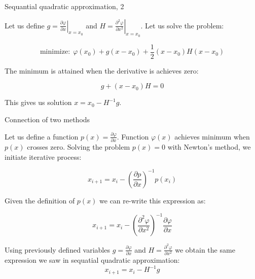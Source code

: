 \documentclass{beamer}
\begin{document}
\begin{frame}{Sequantial quadratic approximation, 2}
	\begin{flushleft}
		
		Let us define $g =\left. \frac{\partial \varphi}{\partial x} \right \vert_{x = x_0}$ and $H = \left. \frac{\partial^2 \varphi}{\partial x^2}\right \vert_{x = x_0}$. Let us solve the problem:
		
		\begin{equation}
			\text{minimize:} \ \ \varphi(x_0) + g (x - x_0)
			+  \frac{1}{2}  (x - x_0) H (x - x_0)
		\end{equation}
		
		The minimum is attained when the derivative is achieves zero:
		
		\begin{equation}
			g + (x - x_0) H = 0
		\end{equation}
		
		This gives us solution $x = x_0 - H^{-1} g$.
		
	\end{flushleft}
\end{frame}





\begin{frame}{Connection of two methods}
	\begin{flushleft}
		
		Let us define a function $p(x) = \frac{\partial \varphi}{\partial x}$. Function $\varphi (x)$ achieves minimum when $p(x)$ crosses zero. Solving the problem $p(x) = 0$ with Newton's method, we initiate iterative process:
		
		\begin{equation}
			x_{i+1} = x_i  - \left ( \frac{\partial p}{\partial x} \right )^{-1} p(x_i)
		\end{equation}
		
		Given the definition of $p(x)$ we can re-write this expression as:
		
		\begin{equation}
			x_{i+1} = x_i  - \left ( \frac{\partial^2 \varphi}{\partial x^2} \right )^{-1} \frac{\partial \varphi}{\partial x}
		\end{equation}
		
		Using previously defined variables $g =\frac{\partial \varphi}{\partial x}$ and $H = \frac{\partial^2 \varphi}{\partial x^2}$ we obtain the same expression we saw in sequatial quadratic approximation:
		\begin{equation}
			x_{i+1} = x_i  - H^{-1} g
		\end{equation}

	\end{flushleft}
\end{frame}
\end{document}
